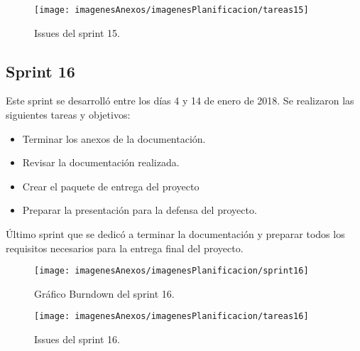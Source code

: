 \begin{figure}[h]
    \begin{center}%
        \begin{center}%
          \texttt{[image: imagenesAnexos/imagenesPlanificacion/tareas15]}%
          \caption{Issues del sprint 15.}%
          \label{figTareas15}%
        \end{center}%
  	\end{center}%
\end{figure}%

\newpage

\subsection{Sprint 16}

Este sprint se desarrolló entre los días 4 y 14 de enero de 2018. Se realizaron las siguientes tareas y objetivos:

\begin{itemize}
	\item Terminar los anexos de la documentación.
	\item Revisar la documentación realizada.
	\item Crear el paquete de entrega del proyecto
	\item Preparar la presentación para la defensa del proyecto.
\end{itemize}

Último sprint que se dedicó a terminar la documentación y preparar todos los requisitos necesarios para la entrega final del proyecto.

\newpage
\begin{figure}[ht]
    \begin{center}%
        \begin{center}%
          \texttt{[image: imagenesAnexos/imagenesPlanificacion/sprint16]}%
          \caption{Gráfico Burndown del sprint 16.}%
          \label{figSprint16}%
        \end{center}%
  	\end{center}%
\end{figure}%

\begin{figure}[h]
    \begin{center}%
        \begin{center}%
          \texttt{[image: imagenesAnexos/imagenesPlanificacion/tareas16]}%
          \caption{Issues del sprint 16.}%
          \label{figTareas16}%
        \end{center}%
  	\end{center}%
\end{figure}%

